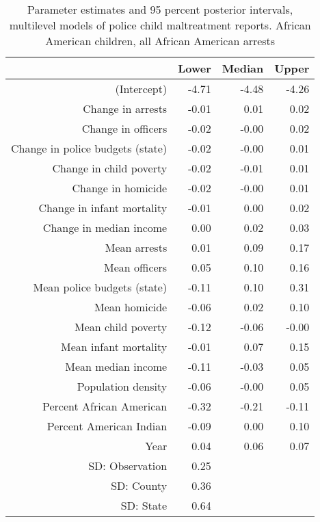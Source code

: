 \begin{table}[ht]
\centering
\begin{tabular}{rrrr}
  \hline
 & Lower & Median & Upper \\ 
  \hline
(Intercept) & -4.71 & -4.48 & -4.26 \\ 
  Change in arrests & -0.01 & 0.01 & 0.02 \\ 
  Change in officers & -0.02 & -0.00 & 0.02 \\ 
  Change in police budgets (state) & -0.02 & -0.00 & 0.01 \\ 
  Change in child poverty & -0.02 & -0.01 & 0.01 \\ 
  Change in homicide & -0.02 & -0.00 & 0.01 \\ 
  Change in infant mortality & -0.01 & 0.00 & 0.02 \\ 
  Change in median income & 0.00 & 0.02 & 0.03 \\ 
  Mean arrests & 0.01 & 0.09 & 0.17 \\ 
  Mean officers & 0.05 & 0.10 & 0.16 \\ 
  Mean police budgets (state) & -0.11 & 0.10 & 0.31 \\ 
  Mean homicide & -0.06 & 0.02 & 0.10 \\ 
  Mean child poverty & -0.12 & -0.06 & -0.00 \\ 
  Mean infant mortality & -0.01 & 0.07 & 0.15 \\ 
  Mean median income & -0.11 & -0.03 & 0.05 \\ 
  Population density & -0.06 & -0.00 & 0.05 \\ 
  Percent African American & -0.32 & -0.21 & -0.11 \\ 
  Percent American Indian & -0.09 & 0.00 & 0.10 \\ 
  Year & 0.04 & 0.06 & 0.07 \\ 
  SD: Observation & 0.25 &  &  \\ 
  SD: County & 0.36 &  &  \\ 
  SD: State & 0.64 &  &  \\ 
   \hline
\end{tabular}
\caption{Parameter estimates and 95 percent posterior intervals, multilevel models of 
             police child maltreatment reports. African American children, all African American arrests} 
\end{table}
